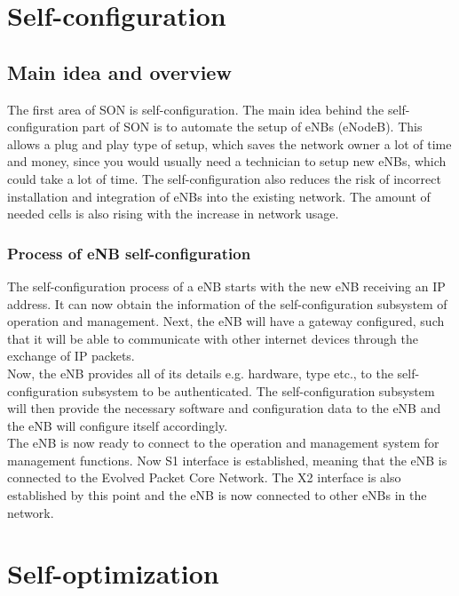\documentclass{report}
\begin{document}
\chapter{Self-configuration}
\section{Main idea and overview}
The first area of SON is self-configuration. The main idea behind the self-configuration part of SON is to automate the setup of eNBs (eNodeB). This allows a plug and play type of setup, which saves the network owner a lot of time and money, since you would usually need a technician to setup new eNBs, which could take a lot of time.  
The self-configuration also reduces the risk of incorrect installation and integration of eNBs into the existing network. The amount of needed cells is also rising with the increase in network usage.

\subsection{Process of eNB self-configuration}
The self-configuration process of a eNB starts with the new eNB receiving an IP address. It can now obtain the information of the self-configuration subsystem of operation and management. Next, the eNB will have a gateway configured, such that it will be able to communicate with other internet devices through the exchange of IP packets. \\
Now, the eNB provides all of its details e.g. hardware, type etc., to the self-configuration subsystem to be authenticated. The self-configuration subsystem will then provide the necessary software and configuration data to the eNB and the eNB will configure itself accordingly. \\
The eNB is now ready to connect to the operation and management system for management functions. Now S1 interface is established, meaning that the eNB is connected to the Evolved Packet Core Network. The X2 interface is also established by this point and the eNB is now connected to other eNBs in the network.

\chapter{Self-optimization}
\end{document}
